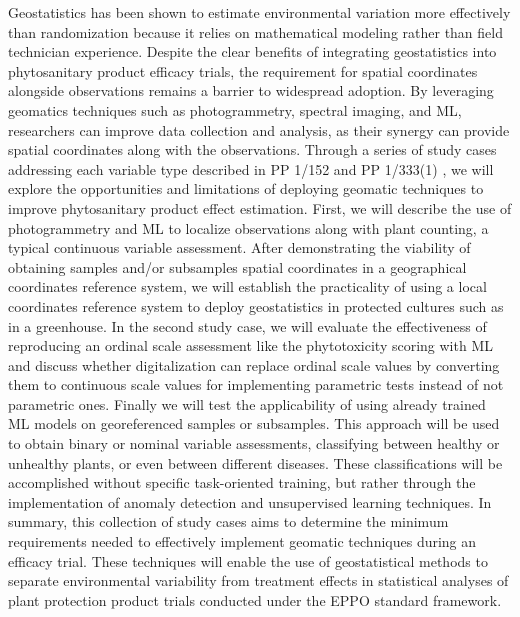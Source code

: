 \documentclass[12pt,a4paper,oneside]{report}
\begin{document}
Geostatistics has been shown to estimate environmental variation more effectively 
than randomization because it relies on mathematical modeling rather than field 
technician experience.
Despite the clear benefits of integrating geostatistics into phytosanitary
product efficacy trials, the requirement for spatial coordinates alongside 
observations remains a barrier to widespread adoption.
By leveraging geomatics techniques such as photogrammetry,
spectral imaging, and ML, researchers can improve data collection and 
analysis, as their synergy can provide spatial coordinates
along with the observations.
Through a series of study cases addressing each variable type described in 
PP 1/152 \cite{EPPO_PP1_152} and 
PP 1/333(1) \cite{PP1333}, 
we will explore the opportunities and limitations of deploying geomatic techniques 
to improve phytosanitary product effect estimation.
First, we will describe the use of photogrammetry and ML to localize observations
along with plant counting, a typical continuous variable assessment. 
After demonstrating the viability of obtaining samples and/or subsamples spatial coordinates in a
geographical coordinates reference system, we will establish the practicality of using a local 
coordinates reference system to deploy geostatistics in protected cultures such as in 
a greenhouse. In the second study case, we will evaluate the effectiveness of 
reproducing an ordinal scale assessment like the phytotoxicity scoring with 
ML and discuss whether digitalization can replace ordinal scale values by 
converting them to continuous scale values for implementing parametric tests instead 
of not parametric
ones. Finally we will test the applicability of using already trained ML models 
on georeferenced samples or subsamples. This approach will be used to
obtain binary or nominal variable assessments, classifying between healthy or unhealthy
plants, or even between different diseases. These classifications will be accomplished 
without specific task-oriented training, but rather through the implementation of 
anomaly detection and unsupervised learning techniques.
In summary, this collection of study cases aims to determine the minimum requirements 
needed to effectively implement geomatic techniques during an efficacy trial. 
These techniques will enable 
the use of geostatistical methods to separate environmental variability from treatment 
effects in statistical analyses of plant protection product trials conducted under 
the EPPO standard framework.



\end{document}
